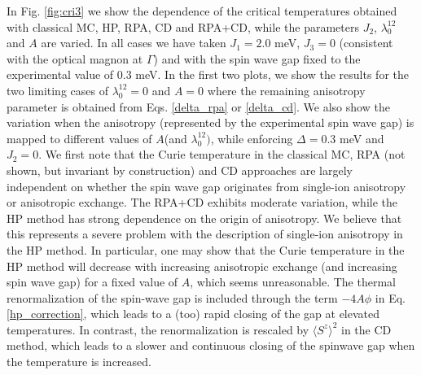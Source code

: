 \documentclass[aps,prb,reprint,floatfix,superscriptaddress]{revtex4-2}
\begin{document}
In Fig. \ref{fig:cri3} we show the dependence of the critical temperatures obtained with classical MC, HP, RPA, CD and RPA+CD, while the parameters $J_2$, $\lambda^{12}_0$ and $A$ are varied. In all cases we have taken $J_1=2.0$ meV, $J_3=0$ (consistent with the optical magnon at $\Gamma$) and with the spin wave gap fixed to the experimental value of 0.3 meV. In the first two plots, we show the results for the two limiting cases of $\lambda^{12}_0=0$ and $A=0$ where the remaining anisotropy parameter is obtained from Eqs. \eqref{delta_rpa} or \eqref{delta_cd}. We also show the variation when the anisotropy (represented by the experimental spin wave gap) is mapped to different values of $A$(and $\lambda^{12}_0)$, while enforcing $\Delta=0.3$ meV and $J_2=0$. We first note that the Curie temperature in the classical MC, RPA (not shown, but invariant by construction) and CD approaches are largely independent on whether the spin wave gap originates from single-ion anisotropy or anisotropic exchange. The RPA+CD exhibits moderate variation, while the HP method has strong dependence on the origin of anisotropy. We believe that this represents a severe problem with the description of single-ion anisotropy in the HP method. In particular, one may show that the Curie temperature in the HP method will decrease with increasing anisotropic exchange (and increasing spin wave gap) for a fixed value of $A$, which seems unreasonable. The thermal renormalization of the spin-wave gap is included through the term $-4A\phi$ in Eq. \eqref{hp_correction}, which leads to a (too) rapid closing of the gap at elevated temperatures. In contrast, the renormalization is rescaled by $\langle S^z\rangle^2$ in the CD method, which leads to a slower and continuous closing of the spinwave gap when the temperature is increased.
\end{document}
